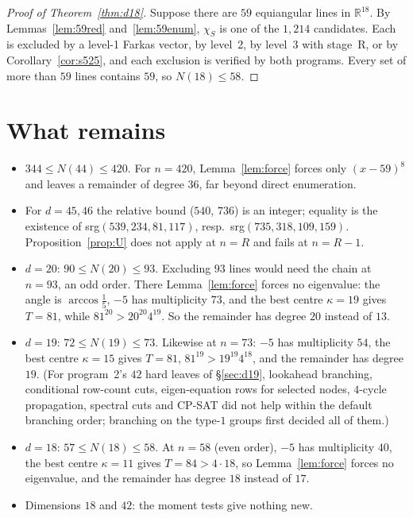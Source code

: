 \documentclass[11pt]{article}
\theoremstyle{definition}
\newcommand{\R}{\mathbb{R}}
\begin{document}
\begin{proof}[Proof of Theorem~\ref{thm:d18}]
Suppose there are $59$ equiangular lines in $\R^{18}$. By Lemmas~\ref{lem:59red} and~\ref{lem:59enum},
$\chi_S$ is one of the $1{,}214$ candidates. Each is excluded by a level-1 Farkas vector, by level~2, by
level~3 with stage~R, or by Corollary~\ref{cor:s525}, and each exclusion is verified by both programs.
Every set of more than $59$ lines contains $59$, so $N(18)\le58$.
\end{proof}

\section{What remains}
\begin{itemize}
\item $344\le N(44)\le420$. For $n=420$, Lemma~\ref{lem:force} forces only $(x-59)^8$ and leaves a
remainder of degree $36$, far beyond direct enumeration.
\item For $d=45,46$ the relative bound ($540$, $736$) is an integer; equality is the existence of
srg$(539,234,81,117)$, resp.\ srg$(735,318,109,159)$. Proposition~\ref{prop:U} does not apply at
$n=R$ and fails at $n=R-1$.
\item $d=20$: $90\le N(20)\le93$. Excluding $93$ lines would need the chain at $n=93$, an odd
order. There Lemma~\ref{lem:force} forces no eigenvalue: the angle is $\arccos\frac15$, $-5$ has
multiplicity $73$, and the best centre $\kappa=19$ gives $T=81$, while $81^{20}>20^{20}4^{19}$. So
the remainder has degree $20$ instead of $13$.
\item $d=19$: $72\le N(19)\le73$. Likewise at $n=73$: $-5$ has multiplicity $54$, the best centre
$\kappa=15$ gives $T=81$, $81^{19}>19^{19}4^{18}$, and the remainder has degree $19$. (For program~2's
$42$ hard leaves of \S\ref{sec:d19}, lookahead branching, conditional row-count cuts, eigen-equation
rows for selected nodes, $4$-cycle propagation, spectral cuts and CP-SAT did not help within the
default branching order; branching on the type-$1$ groups first decided all of them.)
\item $d=18$: $57\le N(18)\le58$. At $n=58$ (even order), $-5$ has multiplicity $40$, the best centre
$\kappa=11$ gives $T=84>4\cdot18$, so Lemma~\ref{lem:force} forces no eigenvalue, and the remainder
has degree $18$ instead of $17$.
\item Dimensions $18$ and $42$: the moment tests give nothing new.
\end{itemize}
\end{document}
